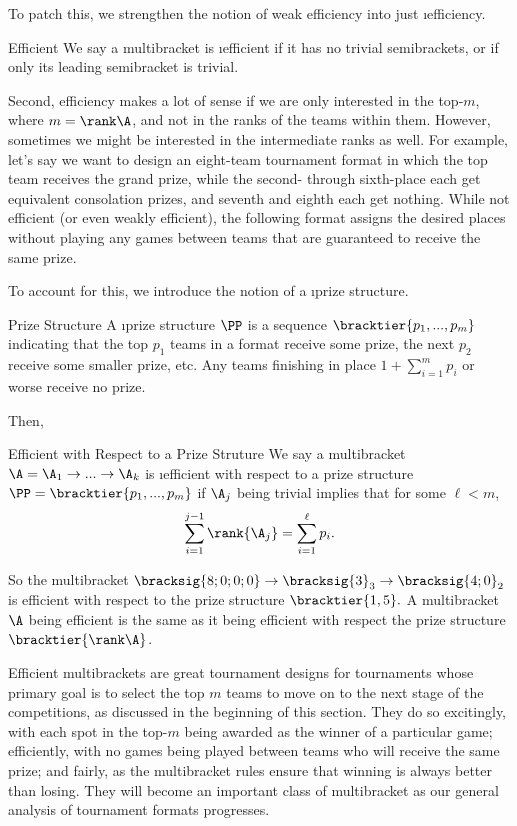 {    To patch this, we strengthen the notion of weak efficiency into just \i{efficiency.}

    \begin{definition}{Efficient}{}
        We say a multibracket is \i{efficient} if it has no trivial semibrackets, or if only its leading semibracket is trivial.
    \end{definition}

    Second, efficiency makes a lot of sense if we are only interested in the top-$m$, where $m = \rank\A$, and not in the ranks of the teams within them. However, sometimes we might be interested in the intermediate ranks as well. For example, let's say we want to design an eight-team tournament format in which the top team receives the grand prize, while the second- through sixth-place each get equivalent consolation prizes, and seventh and eighth each get nothing. While not efficient (or even weakly efficient), the following format assigns the desired places without playing any games between teams that are guaranteed to receive the same prize.


    To account for this, we introduce the notion of a \i{prize structure}.
    
    \begin{definition}{Prize Structure}{}
        A \i{prize structure} $\PP$ is a sequence $\bracktier{p_1, ..., p_m}$ indicating that the top $p_1$ teams in a format receive some prize, the next $p_2$ receive some smaller prize, etc. Any teams finishing in place $1 + \sum_{i=1}^m p_i$ or worse receive no prize.
    \end{definition}

    Then,

    \begin{definition}{Efficient with Respect to a Prize Struture}{}
        We say a multibracket $\A = \A_1 \to ... \to \A_k$ is \i{efficient with respect to a prize structure} $\PP = \bracktier{p_1, ..., p_m}$ if $\A_j$ being trivial implies that for some $\ell < m$, $$\sum_{i=1}^{j-1} \rank {\A_j} = \sum_{i=1}^\ell p_i.$$
    \end{definition}

    So the multibracket $\bracksig{8;0;0;0} \to \bracksig{3}_3 \to \bracksig{4;0}_2$ is efficient with respect to the prize structure $\bracktier{1, 5}.$ A multibracket $\A$ being efficient is the same as it being efficient with respect the prize structure $\bracktier{\rank\A}$.

    Efficient multibrackets are great tournament designs for tournaments whose primary goal is to select the top $m$ teams to move on to the next stage of the competitions, as discussed in the beginning of this section. They do so excitingly, with each spot in the top-$m$ being awarded as the winner of a particular game; efficiently, with no games being played between teams who will receive the same prize; and fairly, as the multibracket rules ensure that winning is always better than losing. They will become an important class of multibracket as our general analysis of tournament formats progresses.
}